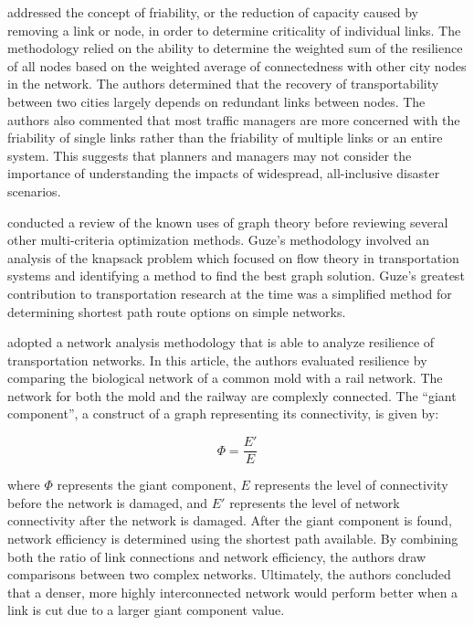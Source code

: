 \citet{ip2011} addressed the concept of {friability}, or
the reduction of capacity caused by removing a link or node, in order to
determine criticality of individual links. The methodology relied on the
ability
to determine the weighted sum of the resilience of all nodes based on the
weighted average of connectedness with other city nodes in the network. The
authors determined that the recovery of transportability between two cities
largely depends on redundant links between nodes. The authors also commented
that
most traffic managers are more concerned with the friability of single
links
rather than the friability of multiple links or an entire system. This suggests
that planners and managers may not consider the importance of
understanding the impacts of widespread, all-inclusive disaster scenarios.

\citet{guze2014} conducted a review of the known uses of graph theory before
reviewing several other multi-criteria optimization methods.
Guze’s methodology involved an
analysis of the knapsack problem which focused on flow theory in transportation
systems and identifying a method to find the best graph solution. Guze’s
greatest contribution to transportation research
at the time was a simplified method
for determining shortest path route options on simple networks.

\citet{osei2014} adopted a network analysis methodology that is able to
analyze
resilience of transportation networks. In this
article, the authors evaluated resilience by comparing the biological
network of a common mold
with a rail network. The network for both the mold and the railway are
complexly connected. The ``giant component'', a construct of a graph representing its connectivity, is given by:

\begin{equation}
	\Phi = \frac{E'}{ E}
\end{equation}

\noindent where $\Phi$ represents the giant component, $E$ represents the
level of connectivity before the network is damaged, and $E'$ represents the
level of network connectivity after the network is damaged. After the giant component
is found, network efficiency is determined using the
shortest path available. By combining both the ratio of link connections and
network efficiency, the authors draw comparisons between two
complex networks. Ultimately, the authors concluded that a denser, more highly
interconnected network would perform better when a link is cut due to a larger giant component value.

